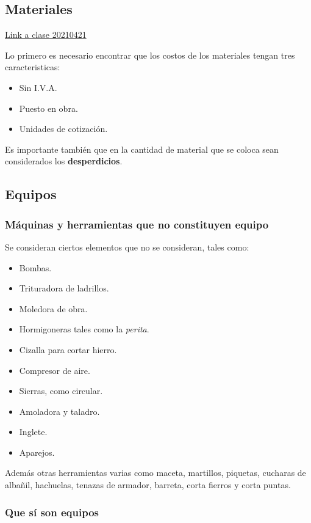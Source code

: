 \documentclass[../main.tex]{subfiles}
\begin{document}
\subsection{Materiales}

\href{https://youtu.be/9XTnfhrvx5Y}{Link a clase 20210421}

Lo primero es necesario encontrar que los costos de los materiales tengan tres
caracteristicas:

\begin{itemize}
  \item Sin I.V.A.
  \item Puesto en obra.
  \item Unidades de cotización.
\end{itemize}

Es importante también que en la cantidad de material que se coloca sean considerados
los \textbf{desperdicios}.

\subsection{Equipos}

\subsubsection{Máquinas y herramientas que no constituyen equipo}

Se consideran ciertos elementos que no se consideran, tales como:

\begin{itemize}
  \item Bombas.
  \item Trituradora de ladrillos.
  \item Moledora de obra.
  \item Hormigoneras tales como la \textit{perita}.
  \item Cizalla para cortar hierro.
  \item Compresor de aire.
  \item Sierras, como circular.
  \item Amoladora y taladro.
  \item Inglete.
  \item Aparejos.
\end{itemize}

Además otras herramientas varias como maceta, martillos, piquetas, cucharas de
albañil, hachuelas, tenazas de armador, barreta, corta fierros y corta puntas.

\subsubsection{Que sí son equipos}
\end{document}
